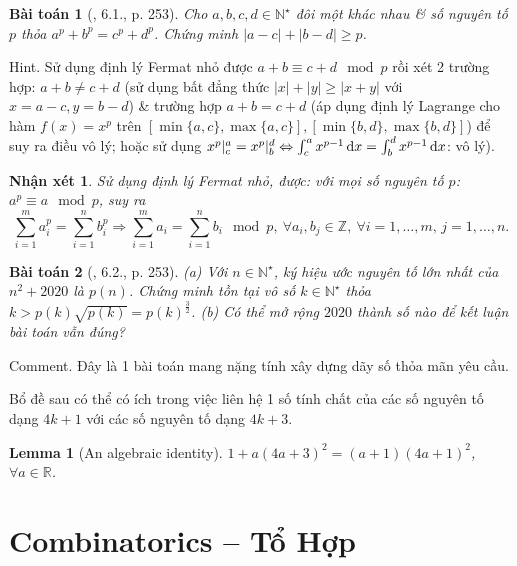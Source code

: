 \documentclass{article}
\newtheorem{baitoan}{Bài toán}
\newtheorem{lemma}{Lemma}
\newtheorem{nhanxet}{Nhận xét}
\begin{document}
\begin{baitoan}[\cite{Quoc_Long_Dat_Nam_VMC}, 6.1., p. 253]
	Cho $a,b,c,d\in\mathbb{N}^\star$ đôi một khác nhau \& số nguyên tố $p$ thỏa $a^p + b^p = c^p + d^p$. Chứng minh $|a - c| + |b - d|\ge p$.
\end{baitoan}
{\sf Hint.} Sử dụng định lý Fermat nhỏ được $a + b\equiv c + d\mod p$ rồi xét 2 trường hợp: $a + b\ne c + d$ (sử dụng bất đẳng thức $|x| + |y|\ge|x + y|$ với $x = a - c,y = b - d$) \& trường hợp $a + b = c + d$ (áp dụng định lý Lagrange cho hàm $f(x) = x^p$ trên $[\min\{a,c\},\max\{a,c\}],[\min\{b,d\},\max\{b,d\}]$) để suy ra điều vô lý; hoặc sử dụng $x^p|_c^a = x^p|_b^d\Leftrightarrow\int_c^a x^{p-1}\,{\rm d}x = \int_b^d x^{p-1}\,{\rm d}x$: vô lý).

\begin{nhanxet}
	Sử dụng định lý Fermat nhỏ, được: với mọi số nguyên tố $p$: $a^p\equiv a\mod p$, suy ra
	\begin{equation*}
		\sum_{i=1}^m a_i^p = \sum_{i=1}^n b_i^p\Rightarrow\sum_{i=1}^m a_i = \sum_{i=1}^n b_i\mod p,\ \forall a_i,b_j\in\mathbb{Z},\ \forall i = 1,\ldots,m,\,j = 1,\ldots,n.
	\end{equation*}
\end{nhanxet}

\begin{baitoan}[\cite{Quoc_Long_Dat_Nam_VMC}, 6.2., p. 253]
	(a) Với $n\in\mathbb{N}^\star$, ký hiệu ước nguyên tố lớn nhất của $n^2 + 2020$ là $p(n)$. Chứng minh tồn tại vô số $k\in\mathbb{N}^\star$ thỏa $k > p(k)\sqrt{p(k)} = p(k)^{\frac{3}{2}}$. (b) Có thể mở rộng $2020$ thành số nào để kết luận bài toán vẫn đúng?
\end{baitoan}
{\sf Comment.} Đây là 1 bài toán mang nặng tính xây dựng dãy số thỏa mãn yêu cầu.

Bổ đề sau có thể có ích trong việc liên hệ 1 số tính chất của các số nguyên tố dạng $4k + 1$ với các số nguyên tố dạng $4k + 3$.

\begin{lemma}[An algebraic identity]
	$1 + a(4a + 3)^2 = (a + 1)(4a + 1)^2$, $\forall a\in\mathbb{R}$.
\end{lemma}


\section{Combinatorics -- Tổ Hợp}
\label{sect: combinatorics}
\end{document}

